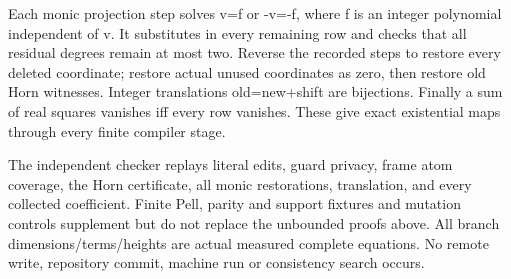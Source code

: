 Each monic projection step solves v=f or -v=-f, where f is an integer
polynomial independent of v. It substitutes in every remaining row and
checks that all residual degrees remain at most two. Reverse the
recorded steps to restore every deleted coordinate; restore actual
unused coordinates as zero, then restore old Horn witnesses. Integer
translations old=new+shift are bijections. Finally a sum of real squares
vanishes iff every row vanishes. These give exact existential maps
through every finite compiler stage.

The independent checker replays literal edits, guard privacy, frame atom
coverage, the Horn certificate, all monic restorations, translation, and
every collected coefficient. Finite Pell, parity and support fixtures
and mutation controls supplement but do not replace the unbounded proofs
above. All branch dimensions/terms/heights are actual measured complete
equations. No remote write, repository commit, machine run or
consistency search occurs.

